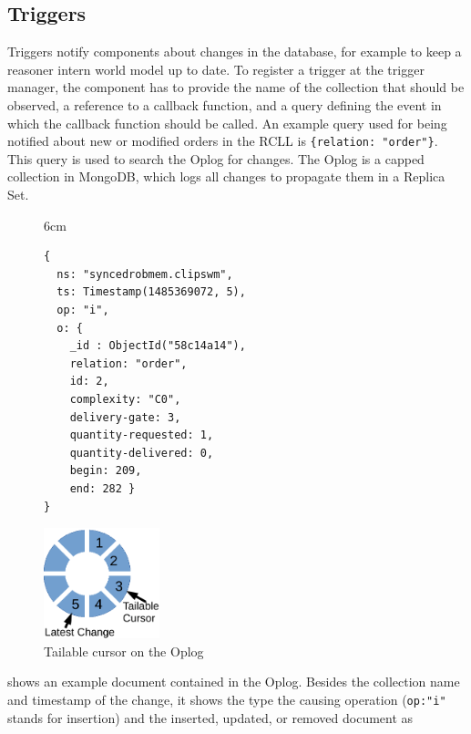 \subsection{Triggers}
\label{sec:impl-triggers}
Triggers notify components about changes in the database, for example
to keep a reasoner intern world model up to date. To register a trigger
at the trigger manager, the component has to provide the name of the
collection that should be observed, a reference to a callback
function, and a query defining the event in which the callback
function should be called. An example query used for being notified
about new or modified orders in the RCLL is \texttt{\{relation:
  "order"\}}. This query is used to search the Oplog for changes. The
Oplog is a capped collection in MongoDB, which logs all changes to
propagate them in a Replica Set.
\begin{figure}{6cm}
  \vspace{-0.8cm}
\begin{lstlisting}[style=SmallJSON,
  caption={Document in the Oplog},
  label=lst:Oplog,
  framexleftmargin=2pt, xleftmargin=0pt,
 morekeywords={}, numbers=none]
{
  ns: "syncedrobmem.clipswm",
  ts: Timestamp(1485369072, 5),
  op: "i",
  o: {
    _id : ObjectId("58c14a14"),
    relation: "order",
    id: 2,
    complexity: "C0",
    delivery-gate: 3,
    quantity-requested: 1,
    quantity-delivered: 0,
    begin: 209,
    end: 282 }
}
\end{lstlisting}
\vspace{-8mm}
\end{figure}
\begin{figure}
  \centering
  \includegraphics[width=0.3\textwidth]{draw/oplog-cursor}%
  \caption[Tailable cursor on the Oplog]{Tailable cursor on the Oplog}
  \vspace{-4mm}
  \label{fig:oplog-cursor}
\end{figure}
 shows an example document contained in the
Oplog. Besides the collection name and timestamp of the change, it
shows the type the causing operation (\texttt{op:"i"} stands for
insertion) and the inserted, updated, or removed document as
